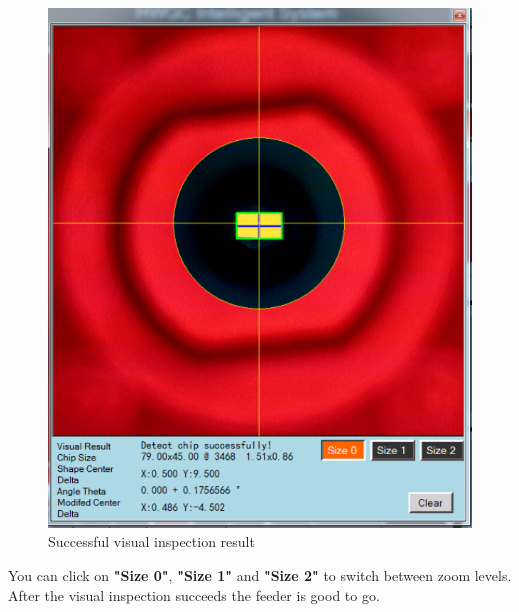 \documentclass[a4paper,10pt]{report}
\begin{document}
 \begin{figure}[!htb]
 \centering
 \includegraphics[width=1\textwidth]{scrot29.png}
 \caption{Successful visual inspection result}
\end{figure}
You can click on \textbf{"Size 0"}, \textbf{"Size 1"} and \textbf{"Size 2"} to switch between zoom levels. After the visual inspection succeeds the feeder is good to go.
\newpage
\end{document}
